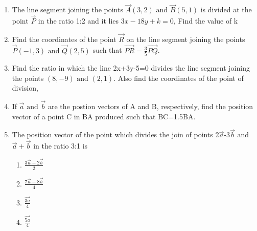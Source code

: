 \begin{enumerate}[label=\thesection.\arabic*,ref=\thesection.\theenumi]
\item The line segment joining the points $\vec{A}(3,2)\text{ and }\vec{B}(5,1)$ is divided at the point $\vec{P}$ in the ratio 1:2 and it lies $3x-18y+k=0$, Find the value of k  
\item Find the coordinates of the point $\vec{R}$ on the line segment joining the points $\vec{P}(-1,3)\text{ and }\vec{Q}(2,5)$ such that $\vec{PR}={\frac{3}{5}}\vec{PQ}$.
\item Find the ratio in which the line 2x+3y-5=0 divides the line segment joining the points $(8,-9)\text{ and }(2,1)$. Also find the coordinates of the point of division,
\item If $\vec{a}$ $\text{and}$ $\vec{b}$ are the postion vectors of A and B, respectively, find the position vector of a point C in BA produced such that BC=1.5BA.
\item The position vector of the point which divides the join of points 2$\vec{a}$-3$\vec{b}$ $\text{and}$ $\vec{a}+\vec{b}$ in the ratio 3:1 is
	\begin{enumerate}
\item $\frac{3\vec{a}-2\vec{b}}{2}$
\item $\frac{7\vec{a}-8\vec{b}}{4}$
\item $\frac{\vec{3a}}{4}$
\item $\frac{\vec{5a}}{4}$
\end{enumerate}
\end{enumerate}

